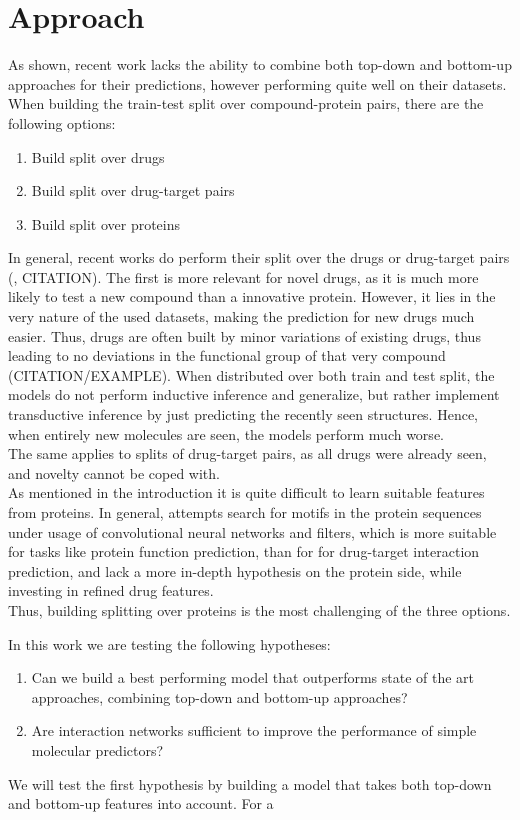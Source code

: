 \documentclass{bioinfo}
\begin{document}
\section{Approach}
As shown, recent work lacks the ability to combine both top-down and bottom-up approaches for their predictions, however performing quite well on their datasets. When building the train-test split over compound-protein pairs, there are the following options:
\begin{enumerate}
	\item Build split over drugs
	\item Build split over drug-target pairs
	\item Build split over proteins
\end{enumerate} 
In general, recent works do perform their split over the drugs or drug-target pairs (\cite{Survey2018}, CITATION). The first is more relevant for novel drugs, as it is much more likely to test a new compound than a innovative protein. However, it lies in the very nature of the used datasets, making the prediction for new drugs much easier. Thus, drugs are often built by minor variations of existing drugs, thus leading to no deviations in the functional group of that very compound (CITATION/EXAMPLE). When distributed over both train and test split, the models do not perform inductive inference and generalize, but rather implement transductive inference by just predicting the recently seen structures. Hence, when entirely new molecules are seen, the models perform much worse. \\
The same applies to splits of drug-target pairs, as all drugs were already seen, and novelty cannot be coped with.\\
As mentioned in the introduction it is quite difficult to learn suitable features from proteins. In general, attempts search for motifs in the protein sequences under usage of convolutional neural networks and filters, which is more suitable for tasks like protein function prediction, than for for drug-target interaction prediction, and lack a more in-depth hypothesis on the protein side, while investing in refined drug features. \\
Thus, building splitting over proteins is the most challenging of the three options.   

In this work we are testing the following hypotheses:
\begin{enumerate}
	\item Can we build a best performing model that outperforms state of the art approaches, combining top-down and bottom-up approaches?
	\item Are interaction networks sufficient to improve the performance of simple molecular predictors?
\end{enumerate}
We will test the first hypothesis by building a model that takes both top-down and bottom-up features into account. For a 
\end{document}
